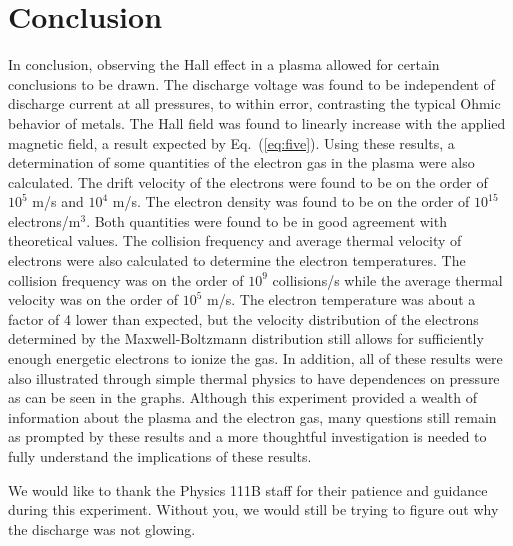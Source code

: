 \documentclass[%
 aip,
rsi,%
 amsmath,amssymb,
 reprint,%
author-numerical,%
]{revtex4-1}
\begin{document}
\section{Conclusion}
In conclusion, observing the Hall effect in a plasma allowed for certain conclusions to be drawn. The discharge voltage was found to be independent of discharge current at all pressures, to within error, contrasting the typical Ohmic behavior of metals. The Hall field was found to linearly increase with the applied magnetic field, a result expected by Eq.~(\ref{eq:five}). \newline
\indent Using these results, a determination of some quantities of the electron gas in the plasma were also calculated. The drift velocity of the electrons were found to be on the order of $10^5$ m/s and $10^4$ m/s. The electron density was found to be on the order of $10^{15}$ electrons/m$^{3}$. Both quantities were found to be in good agreement with theoretical values. The collision frequency and average thermal velocity of electrons were also calculated to determine the electron temperatures. The collision frequency was on the order of $10^9$ collisions/s while the average thermal velocity was on the order of $10^5$ m/s. The electron temperature was about a factor of 4 lower than expected, but the velocity distribution of the electrons determined by the Maxwell-Boltzmann distribution still allows for sufficiently enough energetic electrons to ionize the gas.  In addition, all of these results were also illustrated through simple thermal physics to have dependences on pressure as can be seen in the graphs.\newline
\indent Although this experiment provided a wealth of information about the plasma and the electron gas, many questions still remain as prompted by these results and a more thoughtful investigation is needed to fully understand the implications of these results.


\begin{acknowledgments}
We would like to thank the Physics 111B staff for their patience and guidance during this experiment. Without you, we would still be trying to figure out why the discharge was not glowing. \newline

\end{acknowledgments}
 

\nocite{*}
\end{document}
